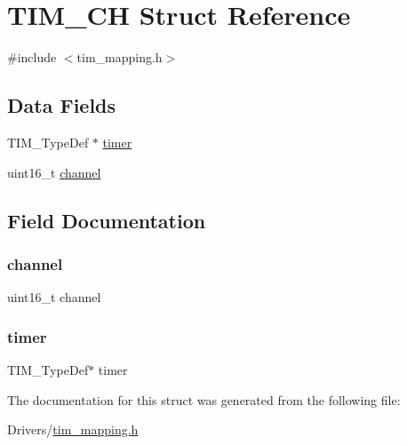 \hypertarget{struct_t_i_m___c_h}{}\section{T\+I\+M\+\_\+\+CH Struct Reference}
\label{struct_t_i_m___c_h}


{\ttfamily \#include $<$tim\+\_\+mapping.\+h$>$}

\subsection*{Data Fields}
\begin{DoxyCompactItemize}
\item 
T\+I\+M\+\_\+\+Type\+Def $\ast$ \hyperlink{struct_t_i_m___c_h_a5f2d7e0e880def3262a850626e3df17d}{timer}
\item 
uint16\+\_\+t \hyperlink{struct_t_i_m___c_h_a416297e763a4ef969dc4b11fbf607c8d}{channel}
\end{DoxyCompactItemize}


\subsection{Field Documentation}
\mbox{\label{struct_t_i_m___c_h_a416297e763a4ef969dc4b11fbf607c8d}} 
\subsubsection{\texorpdfstring{channel}{channel}}
{\footnotesize\ttfamily uint16\+\_\+t channel}

\mbox{\label{struct_t_i_m___c_h_a5f2d7e0e880def3262a850626e3df17d}} 
\subsubsection{\texorpdfstring{timer}{timer}}
{\footnotesize\ttfamily T\+I\+M\+\_\+\+Type\+Def$\ast$ timer}



The documentation for this struct was generated from the following file\+:\begin{DoxyCompactItemize}
\item 
Drivers/\hyperlink{tim__mapping_8h}{tim\+\_\+mapping.\+h}\end{DoxyCompactItemize}
